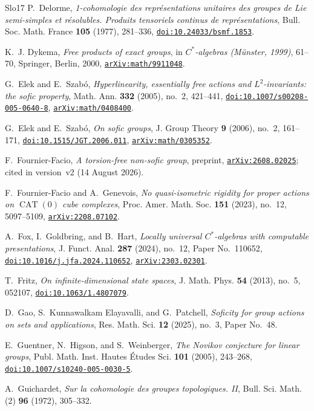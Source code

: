 \documentclass[11pt]{amsart}
\newcommand{\doi}[1]{\href{https://doi.org/#1}{\nolinkurl{doi:#1}}}
\newcommand{\arxiv}[1]{\href{https://arxiv.org/abs/#1}{\nolinkurl{arXiv:#1}}}
\theoremstyle{definition}
\theoremstyle{remark}
\theoremstyle{plain}
\begin{document}
\begin{thebibliography}{Slo17}
P.~Delorme,
\emph{1-cohomologie des repr\'esentations unitaires des groupes de Lie
semi-simples et r\'esolubles. Produits tensoriels continus de
repr\'esentations},
Bull. Soc. Math. France \textbf{105} (1977), 281--336,
\doi{10.24033/bsmf.1853}.

K.~J. Dykema,
\emph{Free products of exact groups},
in \emph{$C^*$-algebras (M\"unster, 1999)}, 61--70,
Springer, Berlin, 2000,
\arxiv{math/9911048}.

G.~Elek and E.~Szab\'o,
\emph{Hyperlinearity, essentially free actions and $L^2$-invariants:
the sofic property},
Math. Ann. \textbf{332} (2005), no.~2, 421--441,
\doi{10.1007/s00208-005-0640-8}, \arxiv{math/0408400}.

G.~Elek and E.~Szab\'o,
\emph{On sofic groups},
J. Group Theory \textbf{9} (2006), no.~2, 161--171,
\doi{10.1515/JGT.2006.011}, \arxiv{math/0305352}.

F.~Fournier-Facio,
\emph{A torsion-free non-sofic group},
preprint, \arxiv{2608.02025}; cited in version~v2 (14 August 2026).

F.~Fournier-Facio and A.~Genevois,
\emph{No quasi-isometric rigidity for proper actions on
$\operatorname{CAT}(0)$ cube complexes},
Proc. Amer. Math. Soc. \textbf{151} (2023), no.~12, 5097--5109,
\arxiv{2208.07102}.

A.~Fox, I.~Goldbring, and B.~Hart,
\emph{Locally universal $C^*$-algebras with computable presentations},
J. Funct. Anal. \textbf{287} (2024), no.~12, Paper No.~110652,
\doi{10.1016/j.jfa.2024.110652}, \arxiv{2303.02301}.

T.~Fritz,
\emph{On infinite-dimensional state spaces},
J. Math. Phys. \textbf{54} (2013), no.~5, 052107,
\doi{10.1063/1.4807079}.

D.~Gao, S.~Kunnawalkam Elayavalli, and G.~Patchell,
\emph{Soficity for group actions on sets and applications},
Res. Math. Sci. \textbf{12} (2025), no.~3, Paper No.~48.

E.~Guentner, N.~Higson, and S.~Weinberger,
\emph{The Novikov conjecture for linear groups},
Publ. Math. Inst. Hautes \'Etudes Sci. \textbf{101} (2005), 243--268,
\doi{10.1007/s10240-005-0030-5}.

A.~Guichardet,
\emph{Sur la cohomologie des groupes topologiques. II},
Bull. Sci. Math. (2) \textbf{96} (1972), 305--332.


\end{thebibliography}
\end{document}
